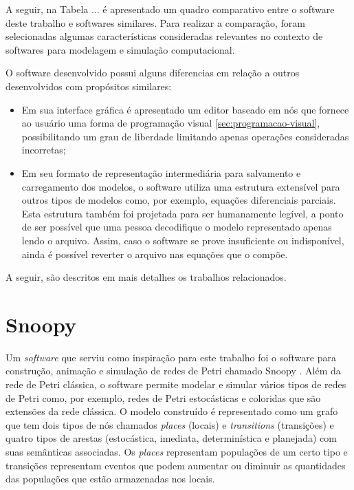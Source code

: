 \documentclass[
	12pt,				%
	openright,			%
	oneside,			%
	a4paper,			%
	main=brazil,
	english,			%
	]{ufsj-abntex2}
\begin{document}
A seguir, na Tabela ... é apresentado um quadro comparativo entre o software deste trabalho e softwares similares. Para realizar a comparação, foram selecionadas algumas características consideradas relevantes no contexto de softwares para modelagem e simulação computacional. 


O software desenvolvido possui alguns diferencias em relação a outros desenvolvidos com propósitos similares:

\begin{itemize}
    \item Em sua interface gráfica é apresentado um editor baseado em nós que fornece ao usuário uma forma de programação visual \ref{sec:programacao-visual}, possibilitando um grau de liberdade limitando apenas operações consideradas incorretas;
    
    \item Em seu formato de representação intermediária para salvamento e carregamento dos modelos, o software utiliza uma estrutura extensível para outros tipos de modelos como, por exemplo, equações diferenciais parciais. Esta estrutura também foi projetada para ser humanamente legível, a ponto de ser possível que uma pessoa decodifique o modelo representado apenas lendo o arquivo. Assim, caso o software se prove insuficiente ou indisponível, ainda é possível reverter o arquivo nas equações que o compõe.  
\end{itemize}

A seguir, são descritos em mais detalhes os trabalhos relacionados. 

\section{Snoopy}

Um \textit{software} que serviu como inspiração para este trabalho foi o software para construção, animação e simulação de redes de Petri chamado Snoopy \cite{Heiner2008,Heiner2012,Liu2012}. Além da rede de Petri clássica, o software permite modelar e simular vários tipos de redes de Petri como, por exemplo, redes de Petri estocásticas e coloridas que são extensões da rede clássica. O modelo construído é representado como um grafo que tem dois tipos de nós chamados \textit{places} (locais) e \textit{transitions} (transições) e quatro tipos de arestas (estocástica, imediata, determinística e planejada) com suas semânticas associadas. Os \textit{places} representam populações de um certo tipo e transições representam eventos que podem aumentar ou diminuir as quantidades das populações que estão armazenadas nos locais. 
\end{document}
